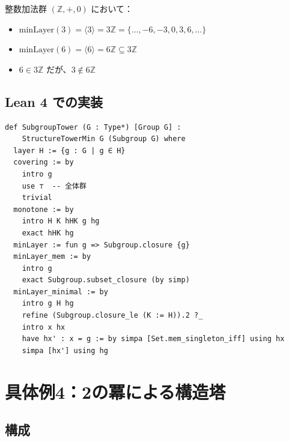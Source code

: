 \documentclass[a4paper,11pt]{ltjsarticle}
\begin{document}
\begin{center}
\end{center}

\begin{examplebox}
整数加法群 $(\mathbb{Z}, +, 0)$ において：
\begin{itemize}
\item $\text{minLayer}(3) = \langle 3 \rangle = 3\mathbb{Z} = \{\ldots, -6, -3, 0, 3, 6, \ldots\}$
\item $\text{minLayer}(6) = \langle 6 \rangle = 6\mathbb{Z} \subseteq 3\mathbb{Z}$
\item $6 \in 3\mathbb{Z}$ だが、$3 \notin 6\mathbb{Z}$
\end{itemize}
\end{examplebox}

\subsection{Lean 4 での実装}

\begin{lstlisting}[style=leanstyle, caption=部分群構造塔の定義]
def SubgroupTower (G : Type*) [Group G] :
    StructureTowerMin G (Subgroup G) where
  layer H := {g : G | g ∈ H}
  covering := by
    intro g
    use ⊤  -- 全体群
    trivial
  monotone := by
    intro H K hHK g hg
    exact hHK hg
  minLayer := fun g => Subgroup.closure {g}
  minLayer_mem := by
    intro g
    exact Subgroup.subset_closure (by simp)
  minLayer_minimal := by
    intro g H hg
    refine (Subgroup.closure_le (K := H)).2 ?_
    intro x hx
    have hx' : x = g := by simpa [Set.mem_singleton_iff] using hx
    simpa [hx'] using hg
\end{lstlisting}

\newpage

\section{具体例4：2の冪による構造塔}

\subsection{構成}
\end{document}
